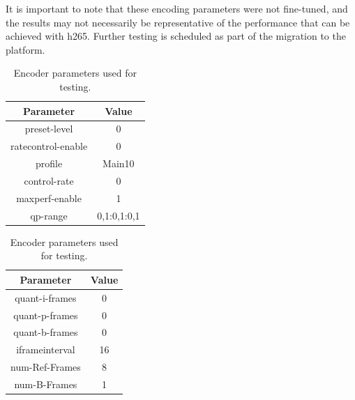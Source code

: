 It is important to note that these encoding parameters were not fine-tuned, and the results may not necessarily be representative of the performance that can be achieved with \gls{h265}.
Further testing is scheduled as part of the migration to the \jo platform.
\begin{table}[H]
    \begin{minipage}[b]{.5\linewidth}
        \centering
        \small
        \begin{tabular}{|c|c|}
            \hline
            \textbf{Parameter} & \textbf{Value} \\
            \hline
            preset-level       & 0              \\
            ratecontrol-enable & 0              \\
            profile            & Main10         \\
            control-rate       & 0              \\
            maxperf-enable     & 1              \\
            qp-range           & 0,1:0,1:0,1    \\
            \hline
        \end{tabular}
    \end{minipage}
    \begin{minipage}[b]{.5\linewidth}
        \centering
        \small
        \begin{tabular}{|c|c|}
            \hline
            \textbf{Parameter} & \textbf{Value} \\
            \hline
            quant-i-frames     & 0              \\
            quant-p-frames     & 0              \\
            quant-b-frames     & 0              \\
            iframeinterval     & 16             \\
            num-Ref-Frames     & 8              \\
            num-B-Frames       & 1              \\
            \hline
        \end{tabular}
    \end{minipage}
    \caption{Encoder parameters used for testing.}
    \label{tab:encoder_parameters}
\end{table}